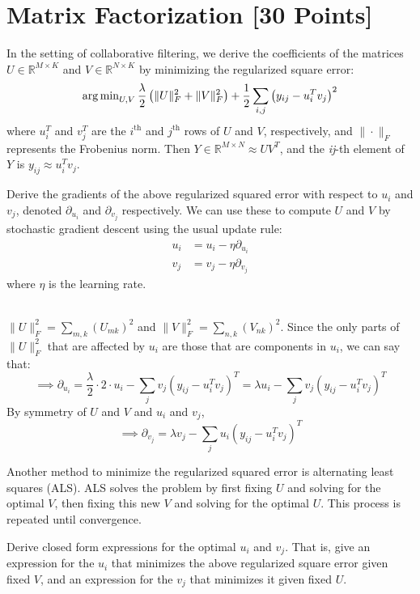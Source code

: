 

\newpage
\section{Matrix Factorization [30 Points]}

In the setting of collaborative filtering, we derive the coefficients of the matrices $U \in \mathbb{R}^{M \times K}$ and $V \in \mathbb{R}^{N \times K}$ by minimizing the regularized square error:
$$\operatorname{arg\,min}_{U,V} \frac{\lambda}{2} \left( \|U\|_F^2 + \|V\|^2_F \right) + \frac{1}{2}\sum_{i,j} \left( y_{ij} - u_i^Tv_j\right)^2$$
where $u_i^T$ and $v_j^T$ are the $i^{\text{th}}$ and $j^{\text{th}}$ rows of $U$ and $V$, respectively, and $\|\cdot\|_F$ represents the Frobenius norm. Then $Y \in \mathbb{R}^{M \times N} \approx UV^T$, and the \textit{ij}-th element of $Y$ is $y_{ij} \approx u_i^Tv_j$.

\problem[5]Derive the gradients of the above regularized squared error with respect to $u_i$ and $v_j$, denoted $\partial_{u_i}$ and $\partial_{v_j}$ respectively.  We can use these to compute $U$ and $V$ by stochastic gradient descent using the usual update rule: 
\begin{align*}
u_i &= u_i - \eta \partial_{u_i} \\
v_j &= v_j - \eta \partial_{v_j}
\end{align*}
where $\eta$ is the learning rate.

\begin{solution}
	\\ $\|U\|_F^2 = \sum_{m,k} (U_{mk})^2$ and $\|V\|_F^2 = \sum_{n,k} (V_{nk})^2$. Since the only parts of $\|U\|_F^2$ that are affected by $u_i$ are those that are components in $u_i$, we can say that:
	$$\implies \partial_{u_i} = \frac{\lambda}{2} \cdot 2 \cdot u_{i} - \sum_{j} v_{j}(y_{ij} - u_{i}^T v_{j})^T = \lambda{u_{i}} - \sum_{j} v_{j}(y_{ij} - u_{i}^T v_{j})^T$$
	By symmetry of $U$ and $V$ and $u_i$ and $v_j$,
	$$\implies \partial_{v_j} = \lambda{v_{j}} - \sum_{j} u_i(y_{ij} - u_{i}^T v_{j})^T$$
\end{solution}

\problem[5]Another method to minimize the regularized squared error is alternating least squares (ALS). ALS solves the problem by first fixing $U$ and solving for the optimal $V$, then fixing this new $V$ and solving for the optimal $U$.  This process is repeated until convergence.

Derive closed form expressions for the optimal $u_i$ and $v_j$.  That is, give an expression for the $u_i$ that minimizes the above regularized square error given fixed $V$, and an expression for the $v_j$ that minimizes it given fixed $U$.


